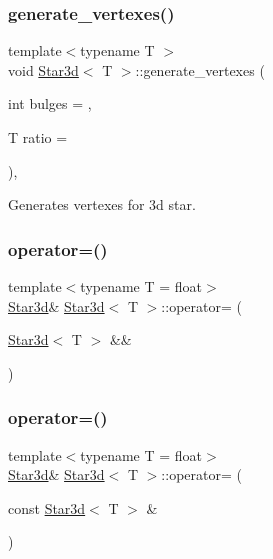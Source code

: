 \subsubsection{\texorpdfstring{generate\+\_\+vertexes()}{generate\_vertexes()}}
{\footnotesize\ttfamily template$<$typename T $>$ \\
void \mbox{\hyperlink{classStar3d}{Star3d}}$<$ T $>$\+::generate\+\_\+vertexes (\begin{DoxyParamCaption}\item[{int}]{bulges = {},  }\item[{T}]{ratio = {} }\end{DoxyParamCaption})\hspace{0.3cm}{\ttfamily [inline]}, {\ttfamily [private]}}



Generates vertexes for 3d star. 

\mbox{\label{classStar3d_a35ace37c66d10033bef1d0acaf9f3283}} 
\subsubsection{\texorpdfstring{operator=()}{operator=()}\hspace{0.1cm}{\footnotesize\ttfamily [1/2]}}
{\footnotesize\ttfamily template$<$typename T  = float$>$ \\
\mbox{\hyperlink{classStar3d}{Star3d}}\& \mbox{\hyperlink{classStar3d}{Star3d}}$<$ T $>$\+::operator= (\begin{DoxyParamCaption}\item[{\mbox{\hyperlink{classStar3d}{Star3d}}$<$ T $>$ \&\&}]{ }\end{DoxyParamCaption})\hspace{0.3cm}{\ttfamily [default]}}

\mbox{\label{classStar3d_a6e1939003aedebc06efdb51404dfbadd}} 
\subsubsection{\texorpdfstring{operator=()}{operator=()}\hspace{0.1cm}{\footnotesize\ttfamily [2/2]}}
{\footnotesize\ttfamily template$<$typename T  = float$>$ \\
\mbox{\hyperlink{classStar3d}{Star3d}}\& \mbox{\hyperlink{classStar3d}{Star3d}}$<$ T $>$\+::operator= (\begin{DoxyParamCaption}\item[{const \mbox{\hyperlink{classStar3d}{Star3d}}$<$ T $>$ \&}]{ }\end{DoxyParamCaption})\hspace{0.3cm}{\ttfamily [default]}}

